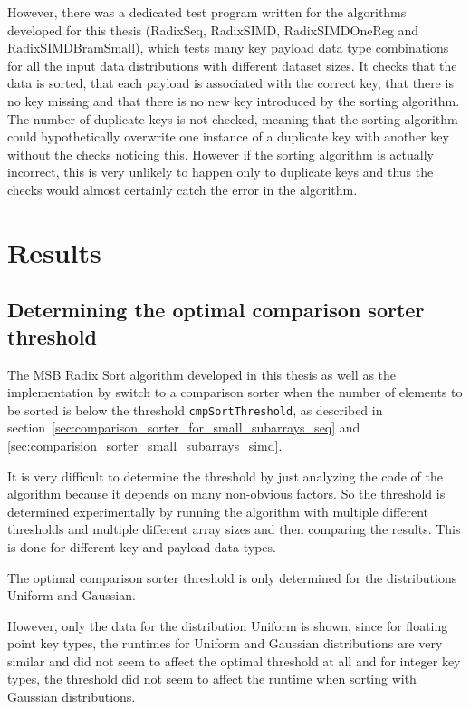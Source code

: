 \documentclass[12pt, a4paper, openright, twoside]{tiarbeit}
\begin{document}
However, there was a dedicated test program written for the algorithms developed
for this thesis (RadixSeq, RadixSIMD, RadixSIMDOneReg and RadixSIMDBramSmall),
which tests many key payload data type combinations for all the input data distributions
with different dataset sizes.
It checks that the data is sorted, that each payload is associated with the correct key, that
there is no key missing and that there is no new key introduced by the
sorting algorithm. The number of duplicate keys is not checked, meaning
that the sorting algorithm could hypothetically overwrite one instance of a duplicate key
with another key without the checks noticing this.
However if the sorting algorithm is actually incorrect, this is very unlikely
to happen only to duplicate keys and thus the checks would almost certainly
catch the error in the algorithm.


\chapter{Results}
\label{chap:results}

\section{Determining the optimal comparison sorter threshold}
\label{sec:determining-the-optimal-comparison-sorter-threshold}

The MSB Radix Sort algorithm developed in this thesis as well as the
implementation by \cite{moeller_radix} switch to a comparison sorter
when the number of elements to be sorted is below the threshold
\texttt{cmpSortThreshold}, as described in
section~\ref{sec:comparison_sorter_for_small_subarrays_seq}
and \ref{sec:comparision_sorter_small_subarrays_simd}.

It is very difficult to determine the threshold by just analyzing the
code of the algorithm because it depends on many non-obvious factors.
So the threshold is
determined experimentally by running the algorithm
with multiple different thresholds and multiple different array sizes
and then comparing the results.
This is done for different key and payload data types.

The optimal comparison sorter threshold is only determined for the
distributions Uniform and Gaussian.

However, only the data for the  distribution Uniform is shown, since
for floating point key types, the runtimes for Uniform and Gaussian
distributions are very similar and did not seem to affect the optimal
threshold at all and for integer key types, the threshold did not seem to affect
the runtime when sorting with Gaussian distributions.
\end{document}
